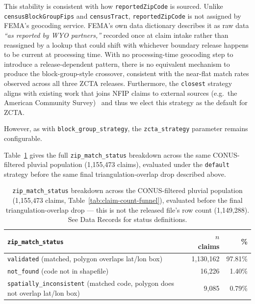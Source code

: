 This stability is consistent with how \texttt{reportedZipCode} is
sourced. Unlike \texttt{censusBlockGroupFips} and \texttt{censusTract},
\texttt{reportedZipCode} is not assigned by FEMA's geocoding service.
FEMA's own data dictionary describes it as raw data \emph{``as reported by
WYO partners,''} recorded once at claim intake rather than reassigned by
a lookup that could shift with whichever boundary release happens to
be current at processing time. With no processing-time geocoding step
to introduce a release-dependent pattern, there is no equivalent
mechanism to produce the block-group-style crossover, consistent with
the near-flat match rates observed across all three ZCTA releases.
Furthermore, the \texttt{closest} strategy aligns with existing work
that joins NFIP claims to external sources (e.g.\ the American
Community Survey)~\cite{cano_pecharroman_exposing_2024,
crespo_flood_2019} and thus we elect this strategy as the default for ZCTA.

However, as with \texttt{block\_group\_strategy}, the \texttt{zcta\_strategy} parameter remains configurable.

Table~\ref{tab:zip-match-status} gives the full \texttt{zip\_match\_status}
breakdown across the same CONUS-filtered pluvial population (1,155,473
claims), evaluated under the \texttt{default} strategy before the same
final triangulation-overlap drop described above.

\begin{table}[H]
\centering
\begin{tabular}{lrr}
\toprule
\texttt{zip\_match\_status} & $n$ claims & \% \\
\midrule
\texttt{validated} (matched, polygon overlaps lat/lon box) & 1{,}130{,}162 & 97.81\% \\
\texttt{not\_found} (code not in shapefile) & 16{,}226 & 1.40\% \\
\texttt{spatially\_inconsistent} (matched code, polygon does not overlap lat/lon box) & 9{,}085 & 0.79\% \\
\bottomrule
\end{tabular}
\caption{\texttt{zip\_match\_status} breakdown across the CONUS-filtered
pluvial population (1,155,473 claims, Table~\ref{tab:claim-count-funnel}),
evaluated before the final triangulation-overlap drop --- this is not
the released file's row count (1,149,288). See Data Records for status
definitions.}
\label{tab:zip-match-status}
\end{table}




